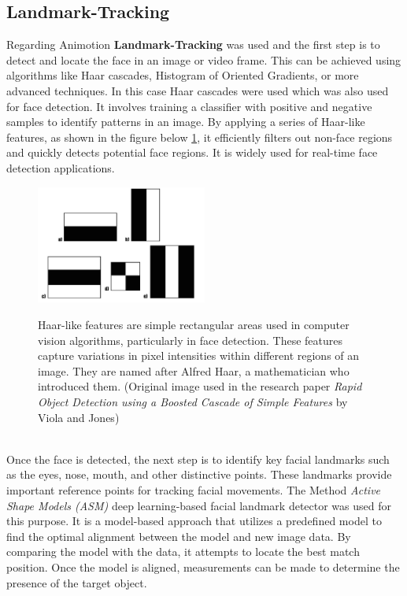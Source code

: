 \subsection{Landmark-Tracking}
Regarding Animotion \textbf{Landmark-Tracking} was used and the first step is to detect
and locate the face in an image or video frame. 
This can be achieved using algorithms like Haar cascades, 
Histogram of Oriented Gradients, or more advanced 
techniques. In this case Haar cascades were used which was also
used for face detection. It involves training a classifier with positive 
and negative samples to identify patterns in an image. By applying a 
series of Haar-like features, as shown in the figure below \ref{fig:haarcascade}, it efficiently filters out non-face 
regions and quickly detects potential face regions. It is widely 
used for real-time face detection applications. \cite{landmarks}
\\
\begin{figure}[htb]
    \centering
    \includegraphics[width=0.5\textwidth]{pics/haarlike.jpg}
    \caption{Haar-like features are simple rectangular areas used in computer vision algorithms, 
    particularly in face detection. These features capture variations in pixel intensities within 
    different regions of an image. They are named after Alfred Haar, a mathematician who introduced them.
    (Original image used in the research paper \emph{Rapid Object Detection using a Boosted Cascade of Simple
    Features} by Viola and Jones)}
    \cite{haarcascade}
    \label{fig:haarcascade}
\end{figure}
\\
Once the face is detected, the next step is to identify key facial landmarks 
such as the eyes, nose, mouth, and other distinctive points. These landmarks 
provide important reference points for tracking facial movements. The Method
\emph{Active Shape Models (ASM)} deep learning-based facial landmark detector was used for this purpose.
It is a model-based approach that utilizes a predefined model to find the 
optimal alignment between the model and new image data. By comparing the 
model with the data, it attempts to locate the best match position. Once 
the model is aligned, measurements can be made to determine the presence 
of the target object. \cite{ASM}

